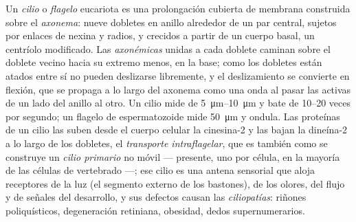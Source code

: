 \begin{definition}\label{def:b3:cytoskeleton-motility:cilia}
Un \emph{cilio} o \emph{flagelo} eucariota es una prolongación cubierta
de membrana construida sobre el \emph{axonema}: nueve 
dobletes en anillo alrededor de un par central, sujetos por enlaces de
nexina y radios, y crecidos a partir de un cuerpo basal, un centríolo
modificado. Las \emph{ axonémicas} unidas a cada doblete caminan
sobre el doblete vecino hacia su extremo menos, en la base; como los
dobletes están atados entre sí no pueden deslizarse libremente, y el
deslizamiento se convierte en flexión, que se propaga a lo largo del
axonema como una onda al pasar las  activas de un lado del anillo
al otro. Un cilio mide de \qtyrange{5}{10}{\micro m} y bate de
\numrange{10}{20} veces por segundo; un flagelo de espermatozoide mide
\qty{50}{\micro m} y ondula. Las proteínas de un cilio las suben desde el
cuerpo celular la cinesina-2 y las bajan la dineína-2 a lo largo de los
dobletes, el \emph{transporte intraflagelar}, que es también como se
construye un \emph{cilio primario} no móvil --- presente, uno por
célula, en la mayoría de las células de vertebrado ---; ese cilio es una
antena sensorial que aloja receptores de la luz (el segmento externo de
los bastones), de los olores, del flujo y de señales del desarrollo, y
sus defectos causan las \emph{ciliopatías}: riñones poliquísticos,
degeneración retiniana, obesidad, dedos supernumerarios.
\end{definition}

